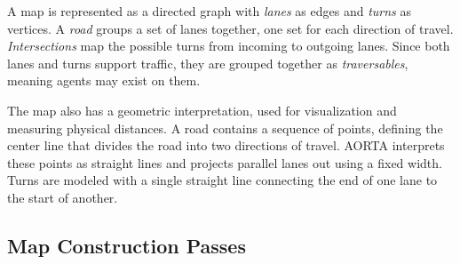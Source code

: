 \documentclass[letterpaper, 10 pt, conference]{ieeeconf}  %
\begin{document}

A map is represented as a directed graph with \emph{lanes} as edges and
\emph{turns} as vertices. A \emph{road} groups a set of lanes together, one set
for each direction of travel. \emph{Intersections} map the possible turns from
incoming to outgoing lanes.  Since both lanes and turns support traffic, they
are grouped together as \emph{traversables}, meaning agents may exist on them.

The map also has a geometric interpretation, used for visualization and
measuring physical distances. A road contains a sequence of points, defining
the center line that divides the road into two directions of travel. AORTA
interprets these points as straight lines and projects parallel lanes out using
a fixed width. Turns are modeled with a single straight line connecting the end
of one lane to the start of another.

\subsection{Map Construction Passes}
\label{sec:mapconstruction}
\end{document}
